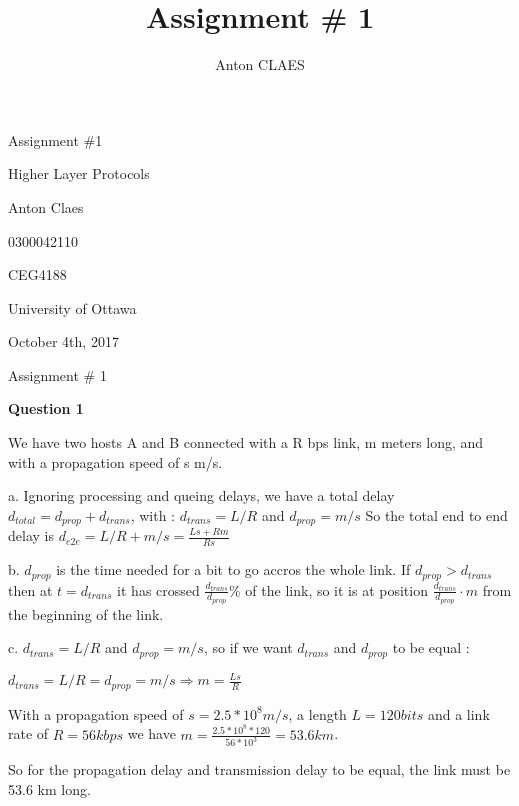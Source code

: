 \documentclass[a4paper,man,natbib,12]{apa6}
\title{Assignment \# 1}
\author{Anton CLAES}
\affiliation{University of Ottawa}
\begin{document}
\thispagestyle{empty}

\begin{center}
\vspace*{5\baselineskip}
Assignment \#1

Higher Layer Protocols

\vspace*{10\baselineskip}

Anton Claes

0300042110

CEG4188

University of Ottawa

October 4th, 2017

\newpage

Assignment \# 1
\end{center}




\textbf{Question 1}

We have two hosts A and B connected with a R bps link, m meters long, and with a propagation speed of s m/s. 

a. Ignoring processing and queing delays, we have a total delay $ d_{total} = d_{prop} + d_{trans} $, with :  $ d_{trans} = L/R $ and $ d_{prop} = m/s $ 
So the total end to end delay is $ d_{e2e} = L/R + m/s = \frac{Ls + Rm}{Rs}$

b. $ d_{prop} $ is the time needed for a bit to go accros the whole link. If $ d_{prop} > d_{trans} $ then at $ t = d_{trans} $ it has crossed $ \frac{d_{trans}}{d_{prop}} \%  $ of the link, so it is at position $\frac{d_{trans}}{d_{prop}} \cdot m $ from the beginning of the link.

c. $ d_{trans} = L/R $ and $ d_{prop} = m/s $, so if we want  $ d_{trans} $ and $ d_{prop} $ to be equal :

$ d_{trans} = L/R =  d_{prop} = m/s \Rightarrow m = \frac{Ls}{R} $ 

With a propagation speed of $ s = 2.5 * 10^8 m/s$, a length $ L = 120 bits$ and a link rate of $ R = 56 kbps $ we have $ m = \frac{2.5*10^8 * 120}{56 * 10^3} = 53.6 km $.

So for the propagation delay and transmission delay to be equal, the link must be 53.6 km long.
\end{document}
